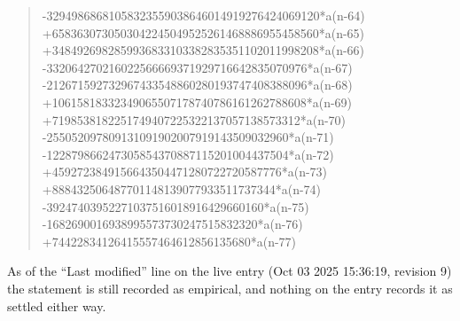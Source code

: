 \documentclass[11pt,a4paper]{article}
\theoremstyle{plain}
\theoremstyle{definition}
\begin{document}
\begin{quote}
-32949868681058323559038646014919276424069120*a(n-64) +6583630730503042245049525261468886955458560*a(n-65) +3484926982859936833103382835351102011998208*a(n-66) -332064270216022566669371929716642835070976*a(n-67) -212671592732967433548860280193747408388096*a(n-68) +10615818332349065507178740786161262788608*a(n-69) +7198538182251749407225322137057138573312*a(n-70) -255052097809131091902007919143509032960*a(n-71) -122879866247305854370887115201004437504*a(n-72) +4592723849156643504471280722720587776*a(n-73) +888432506487701148139077933511737344*a(n-74) -39247403952271037516018916429660160*a(n-75) -1682690016938995573730247515832320*a(n-76) +74422834126415557464612856135680*a(n-77)
\end{quote}
As of the ``Last modified'' line on the live entry (Oct 03 2025 15:36:19, revision 9) the statement is
still recorded as empirical, and nothing on the entry records it as settled either way.
\end{document}

